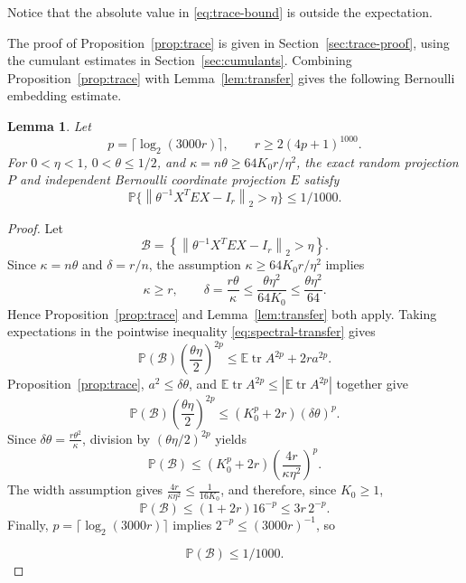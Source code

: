 \documentclass[11pt]{article}
\newtheorem{lemma}[theorem]{Lemma}
\theoremstyle{definition}
\theoremstyle{remark}
\theoremstyle{plain}
\newcommand{\E}{\mathbb E}
\newcommand{\Prob}{\mathbb P}
\DeclareMathOperator{\tr}{tr}
\newcommand{\norm}[1]{\left\lVert#1\right\rVert_2}
\begin{document}
Notice that the absolute value in \eqref{eq:trace-bound} is outside the expectation.

The proof of Proposition~\ref{prop:trace} is given in
Section~\ref{sec:trace-proof}, using the cumulant estimates in
Section~\ref{sec:cumulants}. Combining Proposition~\ref{prop:trace}
with Lemma~\ref{lem:transfer} gives the following Bernoulli
embedding estimate.


\begin{samepage}
\begin{lemma}\label{cor:bernoulli}
Let
\[
 p=\lceil\log_2(3000r)\rceil,
 \qquad
 r\ge2(4p+1)^{1000}.
\]
For \(0<\eta<1\), \(0<\theta\le1/2\), and
\(\kappa=n\theta\ge64K_0r/\eta^2\), the exact random projection \(P\)
and independent Bernoulli coordinate projection \(E\) satisfy
\begin{equation}\label{eq:bernoulli-bound}
 \Prob\{\norm{\theta^{-1}X^TEX-I_r}>\eta\}\le1/1000.
\end{equation}
\end{lemma}
\end{samepage}
\begin{proof}
Let
$$
 \mathcal B
   =\left\{
      \norm{\theta^{-1}X^TEX-I_r}>\eta
     \right\}.
$$
Since \(\kappa=n\theta\) and \(\delta=r/n\), the assumption
\(\kappa\ge64K_0r/\eta^2\) implies
$$
 \kappa\ge r,
 \qquad
 \delta=\frac{r\theta}{\kappa}
     \le \frac{\theta\eta^2}{64K_0}
     \le \frac{\theta\eta^2}{64}.
$$
Hence Proposition~\ref{prop:trace} and
Lemma~\ref{lem:transfer} both apply. 
Taking expectations in the pointwise inequality
\eqref{eq:spectral-transfer} gives
$$
 \Prob(\mathcal B)\left(\frac{\theta\eta}{2}\right)^{2p}
 \le
 \E\tr A^{2p}+2r a^{2p}.
$$
Proposition~\ref{prop:trace},
\(a^2\le\delta\theta\), and
\(\E\tr A^{2p}\le|\E\tr A^{2p}|\) together give
$$
 \Prob(\mathcal B)\left(\frac{\theta\eta}{2}\right)^{2p}
 \le
 (K_0^p+2r)(\delta\theta)^p.
$$
Since
$
 \delta\theta=\frac{r\theta^2}{\kappa}
$, 
division by \((\theta\eta/2)^{2p}\) yields
$$
 \Prob(\mathcal B)
 \le
 (K_0^p+2r)
 \left(\frac{4r}{\kappa\eta^2}\right)^p.
$$
The width assumption gives
$
 \frac{4r}{\kappa\eta^2}\le\frac1{16K_0}
$, 
and therefore, since \(K_0\ge1\),
$$
 \Prob(\mathcal B)
 \le
 (1+2r)16^{-p}
 \le
 3r\,2^{-p}.
$$
Finally,
\(p=\lceil\log_2(3000r)\rceil\) implies
\(2^{-p}\le(3000r)^{-1}\), so

$$
 \Prob(\mathcal B)\le 1/{1000}.
$$

\end{proof}
\end{document}
